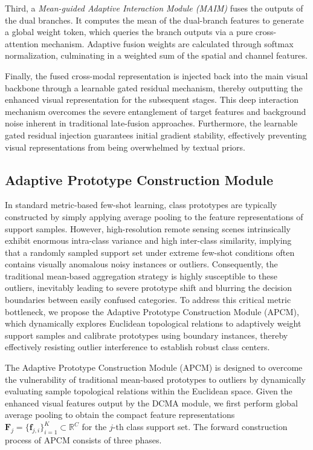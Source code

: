 \documentclass[lettersize,journal]{IEEEtran}
\begin{document}
Third, a \textit{Mean-guided Adaptive Interaction Module (MAIM)} fuses the outputs of the dual branches. 
It computes the mean of the dual-branch features to generate a global weight token, which queries the branch outputs via a pure cross-attention mechanism. 
Adaptive fusion weights are calculated through softmax normalization, culminating in a weighted sum of the spatial and channel features. 

Finally, the fused cross-modal representation is injected back into the main visual backbone through a learnable gated residual mechanism, thereby outputting the enhanced visual representation for the subsequent stages.
This deep interaction mechanism overcomes the severe entanglement of target features and background noise inherent in traditional late-fusion approaches. 
Furthermore, the learnable gated residual injection guarantees initial gradient stability, effectively preventing visual representations from being overwhelmed by textual priors.

\subsection{Adaptive Prototype Construction Module}
\label{sec:apcm}

In standard metric-based few-shot learning, class prototypes are typically constructed by simply applying average pooling to the feature representations of support samples. 
However, high-resolution remote sensing scenes intrinsically exhibit enormous intra-class variance and high inter-class similarity, implying that a randomly sampled support set under extreme few-shot conditions often contains visually anomalous noisy instances or outliers. 
Consequently, the traditional mean-based aggregation strategy is highly susceptible to these outliers, inevitably leading to severe prototype shift and blurring the decision boundaries between easily confused categories.
To address this critical metric bottleneck, we propose the Adaptive Prototype Construction Module (APCM), which dynamically explores Euclidean topological relations to adaptively weight support samples and calibrate prototypes using boundary instances, thereby effectively resisting outlier interference to establish robust class centers.

The Adaptive Prototype Construction Module (APCM) is designed to overcome the vulnerability of traditional mean-based prototypes to outliers by dynamically evaluating sample topological relations within the Euclidean space. 
Given the enhanced visual features output by the DCMA module, we first perform global average pooling to obtain the compact feature representations $\mathbf{F}_j = \{\mathbf{f}_{j,i}\}_{i=1}^K \subset \mathbb{R}^C$ for the $j$-th class support set. 
The forward construction process of APCM consists of three phases. 
\end{document}
